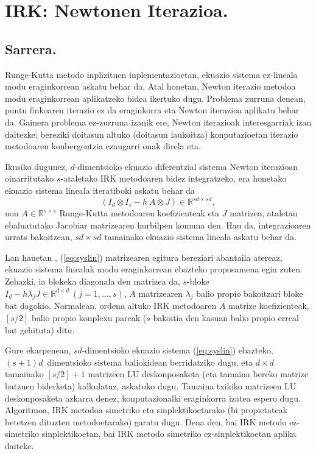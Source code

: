 \chapter{IRK: Newtonen Iterazioa.}


\section{Sarrera.}


Runge-Kutta metodo inplizituen inplementazioetan, ekuazio sistema ez-lineala modu eraginkorrean askatu behar da. Atal honetan, Newton iterazio metodoa modu eraginkorrean aplikatzeko bidea ikertuko dugu.
Problema zurruna denean, puntu finkoaren iterazio ez da eraginkorra eta Newton iterazioa aplikatu behar da. Gainera problema ez-zurruna izanik ere, Newton iterazioak interesgarriak izan daitezke; bereziki doitasun altuko (doitasun laukoitza) konputazioetan iterazio metodoaren konbergentzia ezaugarri onak direla eta. 

Ikusiko dugunez, $d$-dimentsioko ekuazio diferentzial sistema Newton iterazioan oinarritutako $s$-ataletako IRK metodoaren bidez integratzeko, era honetako ekuazio sistema lineala iteratiboki askatu behar da
\begin{equation}
\label{eq:syslin}
(I_d \otimes I_s- h \ A \otimes J) \in \mathbb{R}^{sd \times sd},
\end{equation} 
non $A \in \mathbb{R}^{s \times s}$ Runge-Kutta metodoaren koefizienteak eta $J$ matrizea, ataletan ebaluatutako Jacobiar matrizearen hurbilpen komuna den. Hau da, integrazioaren urrats bakoitzean, $sd \times sd$ tamainako ekuazio sistema lineala askatu behar da.

Lan hauetan \cite{Butcher1976} \cite{Liniger1970} \cite{Bickart1977} , (\ref{eq:syslin}) matrizearen egitura bereziari abantaila atereaz, ekuazio sistema linealak modu eraginkorrean ebazteko proposamena egin zuten. Zehazki, ia blokeka diagonala den matrizea da,  $s$-bloke $I_d-h \lambda_j J \in \mathbb{R}^{d \times d} \ (j=1,\dots,s)$, $A$ matrizearen $\lambda_j$ balio propio  bakoitzari bloke bat dagokio. Normalean, ordena altuko IRK metodoaren $A$ matrize koefizienteak, $[s/2]$ balio propio  konplexu pareak ($s$ bakoitia den kasuan balio propio erreal bat gehituta) ditu.

Gure ekarpenean, $sd$-dimentsioko ekuazio sistema (\ref{eq:syslin}) ebazteko, $(s+1)d$~dimentsioko sistema baliokidean 
berridatziko dugu, eta $d \times d$ tamainako $[s/2]+1$ matrizeen LU deskonposaketa (eta tamaina bereko matrize batzuen biderketa) kalkulatuz, askatuko dugu. Tamaina txikiko matrizeen LU deskonposaketa azkarra denez, konputazionalki eraginkorra izatea espero dugu. Algoritmoa, IRK metodoa simetriko eta sinplektikoetarako (bi propietateak betetzen dituzten metodoetarako) garatu dugu. Dena den, bai IRK metodo ez-simetriko sinplektikoetan, bai IRK metodo simetriko ez-sinplektikoetan aplika daiteke.
 
